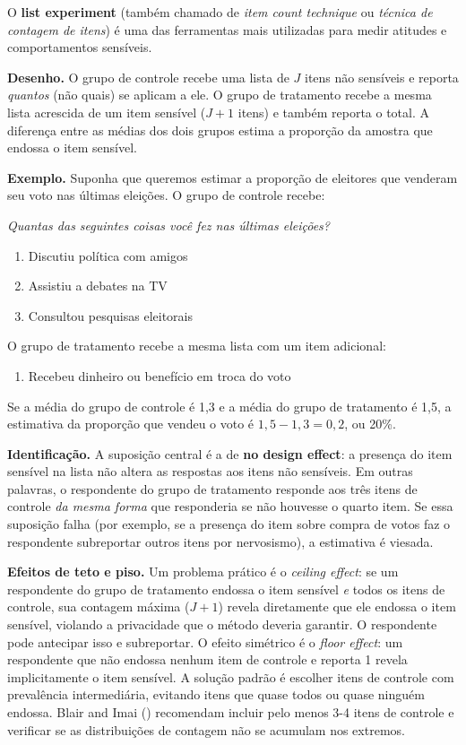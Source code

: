 \documentclass[
]{article}
\providecommand{\tightlist}{%
  \setlength{\itemsep}{0pt}\setlength{\parskip}{0pt}}
\begin{document}
O \textbf{list experiment} (também chamado de \emph{item count technique} ou \emph{técnica de contagem de itens}) é uma das ferramentas mais utilizadas para medir atitudes e comportamentos sensíveis.

\textbf{Desenho.} O grupo de controle recebe uma lista de \(J\) itens não sensíveis e reporta \emph{quantos} (não quais) se aplicam a ele. O grupo de tratamento recebe a mesma lista acrescida de um item sensível (\(J+1\) itens) e também reporta o total. A diferença entre as médias dos dois grupos estima a proporção da amostra que endossa o item sensível.

\textbf{Exemplo.} Suponha que queremos estimar a proporção de eleitores que venderam seu voto nas últimas eleições. O grupo de controle recebe:

\emph{Quantas das seguintes coisas você fez nas últimas eleições?}

\begin{enumerate}
\def\labelenumi{\arabic{enumi}.}
\tightlist
\item
  Discutiu política com amigos
\item
  Assistiu a debates na TV
\item
  Consultou pesquisas eleitorais
\end{enumerate}

O grupo de tratamento recebe a mesma lista com um item adicional:

\begin{enumerate}
\def\labelenumi{\arabic{enumi}.}
\setcounter{enumi}{3}
\tightlist
\item
  Recebeu dinheiro ou benefício em troca do voto
\end{enumerate}

Se a média do grupo de controle é 1,3 e a média do grupo de tratamento é 1,5, a estimativa da proporção que vendeu o voto é \(1{,}5 - 1{,}3 = 0{,}2\), ou 20\%.

\textbf{Identificação.} A suposição central é a de \textbf{no design effect}: a presença do item sensível na lista não altera as respostas aos itens não sensíveis. Em outras palavras, o respondente do grupo de tratamento responde aos três itens de controle \emph{da mesma forma} que responderia se não houvesse o quarto item. Se essa suposição falha (por exemplo, se a presença do item sobre compra de votos faz o respondente subreportar outros itens por nervosismo), a estimativa é viesada.

\textbf{Efeitos de teto e piso.} Um problema prático é o \emph{ceiling effect}: se um respondente do grupo de tratamento endossa o item sensível \emph{e} todos os itens de controle, sua contagem máxima (\(J+1\)) revela diretamente que ele endossa o item sensível, violando a privacidade que o método deveria garantir. O respondente pode antecipar isso e subreportar. O efeito simétrico é o \emph{floor effect}: um respondente que não endossa nenhum item de controle e reporta 1 revela implicitamente o item sensível. A solução padrão é escolher itens de controle com prevalência intermediária, evitando itens que quase todos ou quase ninguém endossa. Blair and Imai () recomendam incluir pelo menos 3-4 itens de controle e verificar se as distribuições de contagem não se acumulam nos extremos.
\end{document}
